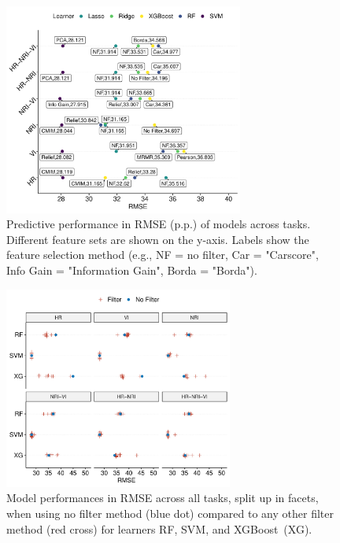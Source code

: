 \documentclass[remotesensing,article,accept,moreauthors,pdftex]{Definitions/mdpi}
\begin{document}
\begin{paracol}{2}
\vspace{-18pt}
\begin{figure}[H]
		\includegraphics[width=0.7\textwidth] {performance-results-1.pdf}
		\caption{Predictive performance in RMSE (p.p.) of models across tasks. Different feature sets are shown on the y-axis. Labels show the feature selection method (e.g., NF = no filter, Car = "Carscore", Info Gain = "Information Gain", Borda = "Borda").}\label{fig:perf-result}
\end{figure}
\vspace{-15pt}

\begin{figure}[H]
		\includegraphics[width=0.67\textwidth] {filter-effect-all-vs-no-filter-1.pdf}
		\caption{Model performances in RMSE across all tasks, split up in facets, when using no filter method (blue dot) compared to any other filter method (red cross) for learners RF, SVM, and XGBoost~(XG).}\label{fig:filter-effects-no-filter}
\end{figure}
\vspace{-18pt}


\end{paracol}
\end{document}
